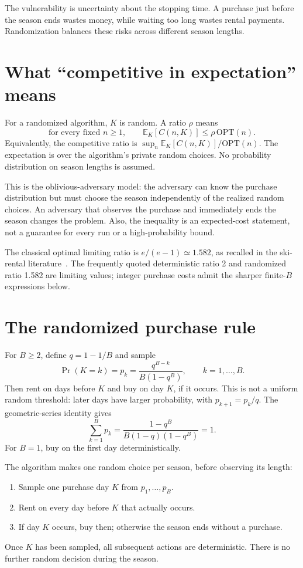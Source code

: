 \documentclass[11pt]{article}
\begin{document}
The vulnerability is uncertainty about the stopping time. A purchase just before the season ends wastes money, while waiting too long wastes rental payments. Randomization balances these risks across different season lengths.

\section{What ``competitive in expectation'' means}
For a randomized algorithm, $K$ is random. A ratio $\rho$ means
\[
\text{for every fixed }n\ge1,\qquad
\mathbb E_K[C(n,K)]\le\rho\,\mathrm{OPT}(n).
\]
Equivalently, the competitive ratio is $\sup_n\mathbb E_K[C(n,K)]/\mathrm{OPT}(n)$. The expectation is over the algorithm's private random choices. No probability distribution on season lengths is assumed.

This is the oblivious-adversary model: the adversary can know the purchase distribution but must choose the season independently of the realized random choices. An adversary that observes the purchase and immediately ends the season changes the problem. Also, the inequality is an expected-cost statement, not a guarantee for every run or a high-probability bound.

The classical optimal limiting ratio is $e/(e-1)\simeq1.582$, as recalled in the ski-rental literature~\cite{background}. The frequently quoted deterministic ratio 2 and randomized ratio 1.582 are limiting values; integer purchase costs admit the sharper finite-$B$ expressions below.

\section{The randomized purchase rule}
For $B\ge2$, define $q=1-1/B$ and sample
\[
\boxed{\Pr(K=k)=p_k=\frac{q^{B-k}}{B(1-q^B)},\qquad k=1,\ldots,B.}
\]
Then rent on days before $K$ and buy on day $K$, if it occurs. This is not a uniform random threshold: later days have larger probability, with $p_{k+1}=p_k/q$. The geometric-series identity gives
\[
\sum_{k=1}^B p_k=
\frac{1-q^B}{B(1-q)(1-q^B)}=1.
\]
For $B=1$, buy on the first day deterministically.

The algorithm makes one random choice per season, before observing its length:
\begin{enumerate}
\item Sample one purchase day $K$ from $p_1,\ldots,p_B$.
\item Rent on every day before $K$ that actually occurs.
\item If day $K$ occurs, buy then; otherwise the season ends without a purchase.
\end{enumerate}
Once $K$ has been sampled, all subsequent actions are deterministic. There is no further random decision during the season.
\end{document}
